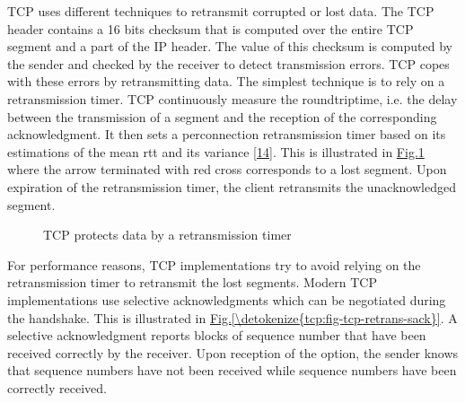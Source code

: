 \documentclass[letterpaper,10pt,english]{sphinxmanual}
\begin{document}
\sphinxAtStartPar
TCP uses different techniques to retransmit corrupted or lost data. The TCP header contains a 16 bits checksum that is computed over the entire TCP segment and a part of the IP header. The value of this checksum is computed by the sender and checked by the receiver to detect transmission errors. TCP copes with these errors by retransmitting data. The simplest technique is to rely on a retransmission timer. TCP continuously measure the round\sphinxhyphen{}trip\sphinxhyphen{}time, i.e. the delay between the transmission of a segment and the reception of the corresponding acknowledgment. It then sets a per\sphinxhyphen{}connection retransmission timer based on its estimations of the mean rtt and its variance {[}\hyperlink{cite.biblio:id6147}{14}{]}. This is illustrated in \hyperref[\detokenize{tcp:fig-tcp-retrans}]{Fig.\@ \ref{\detokenize{tcp:fig-tcp-retrans}}} where the arrow terminated with red cross corresponds to a lost segment. Upon expiration of the retransmission timer, the client retransmits the unacknowledged segment.
\begin{figure}[htbp]\centering\capstart{}\caption{TCP protects data by a retransmission timer}\label{\detokenize{tcp:id10}}\label{\detokenize{tcp:fig-tcp-retrans}}\end{figure}
\sphinxAtStartPar
For performance reasons, TCP implementations try to avoid relying on the retransmission timer to retransmit the lost segments. Modern TCP implementations use selective acknowledgments which can be negotiated during the handshake. This is illustrated in \hyperref[\detokenize{tcp:fig-tcp-retrans-sack}]{Fig.\@ \ref{\detokenize{tcp:fig-tcp-retrans-sack}}}. A selective acknowledgment reports blocks of sequence number that have been received correctly by the receiver. Upon reception of the  option, the sender knows that sequence numbers  have not been received while sequence numbers  have been correctly received.
\end{document}
